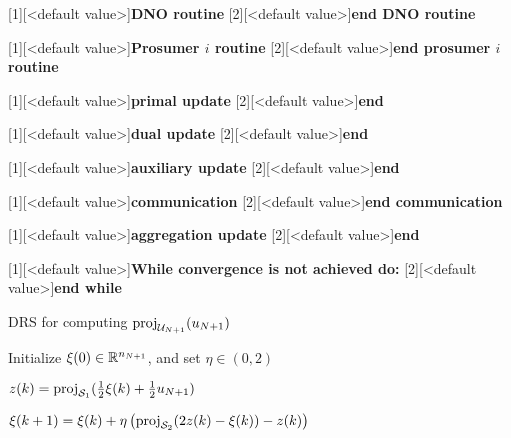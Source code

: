 [1][<default value>]{\textbf{DNO routine}}
[2][<default value>]{\textbf{end DNO routine}}

[1][<default value>]{\textbf{Prosumer $i$ routine}}
[2][<default value>]{\textbf{end prosumer $i$ routine}}

[1][<default value>]{\textbf{primal update}}
[2][<default value>]{\textbf{end}}

[1][<default value>]{\textbf{dual update}}
[2][<default value>]{\textbf{end}}

[1][<default value>]{\textbf{auxiliary update}}
[2][<default value>]{\textbf{end}}

[1][<default value>]{\textbf{communication}}
[2][<default value>]{\textbf{end communication}}

[1][<default value>]{\textbf{aggregation update}}
[2][<default value>]{\textbf{end}}

[1][<default value>]{\textbf{While convergence is not achieved do:}}
[2][<default value>]{\textbf{end while}}

\begin{algorithm}[]
	\caption{DRS for computing $\mathrm{proj}_{\mathcal U_{N+1}}(u_{N+1})$}
	\label{alg:alg2}
	\begin{algorithmic}[1]
		
		\smallskip
		\State Initialize $\xi(0) \in \mathbb R^{n_{N+1}}$, and set $\eta \in (0,2)$
		\IUC{ }
		
		\smallskip
		\State
		$z(k) = \mathrm{proj}_{\mathcal S_1}(\frac{1}{2} \xi(k) + \frac{1}{2} u_{N+1})$ 
		
		
		\smallskip
		\State
		$\xi(k+1) = \xi(k) + \eta \left( \mathrm{proj}_{\mathcal S_2}    (2z(k)-\xi(k)) - z(k)
		\right)$
		\EndIUC
		
	\end{algorithmic}
\end{algorithm}

\smallskip	

